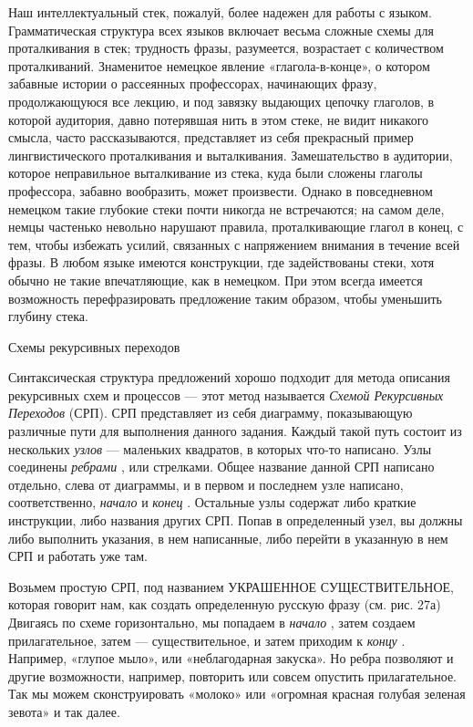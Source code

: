 Наш интеллектуальный стек, пожалуй, более надежен для работы с языком. Грамматическая структура всех языков включает весьма сложные схемы для проталкивания в стек; трудность фразы, разумеется, возрастает с количеством проталкиваний. Знаменитое немецкое явление «глагола-в-конце», о котором забавные истории о рассеянных профессорах, начинающих фразу, продолжающуюся все лекцию, и под завязку выдающих цепочку глаголов, в которой аудитория, давно потерявшая нить в этом стеке, не видит никакого смысла, часто рассказываются, представляет из себя прекрасный пример лингвистического проталкивания и выталкивания. Замешательство в аудитории, которое неправильное выталкивание из стека, куда были сложены глаголы профессора, забавно вообразить, может произвести. Однако в повседневном немецком такие глубокие стеки почти никогда не встречаются; на самом деле, немцы частенько невольно нарушают правила, проталкивающие глагол в конец, с тем, чтобы избежать усилий, связанных с напряжением внимания в течение всей фразы. В любом языке имеются конструкции, где задействованы стеки, хотя обычно не такие впечатляющие, как в немецком. При этом всегда имеется возможность перефразировать предложение таким образом, чтобы уменьшить глубину стека.

Схемы рекурсивных переходов

Синтаксическая структура предложений хорошо подходит для метода описания рекурсивных схем и процессов --- этот метод называется \emph{Схемой Рекурсивных Переходов} (СРП). СРП представляет из себя диаграмму, показывающую различные пути для выполнения данного задания. Каждый такой путь состоит из нескольких \emph{узлов} --- маленьких квадратов, в которых что-то написано. Узлы соединены \emph{ребрами} , или стрелками. Общее название данной СРП написано отдельно, слева от диаграммы, и в первом и последнем узле написано, соответственно, \emph{начало} и \emph{конец} . Остальные узлы содержат либо краткие инструкции, либо названия других СРП. Попав в определенный узел, вы должны либо выполнить указания, в нем написанные, либо перейти в указанную в нем СРП и работать уже там.

Возьмем простую СРП, под названием УКРАШЕННОЕ СУЩЕСТВИТЕЛЬНОЕ, которая говорит нам, как создать определенную русскую фразу (см. рис. 27а) Двигаясь по схеме горизонтально, мы попадаем в \emph{начало} , затем создаем прилагательное, затем --- существительное, и затем приходим к \emph{концу} . Например, «глупое мыло», или «неблагодарная закуска». Но ребра позволяют и другие возможности, например, повторить или совсем опустить прилагательное. Так мы можем сконструировать «молоко» или «огромная красная голубая зеленая зевота» и так далее.

